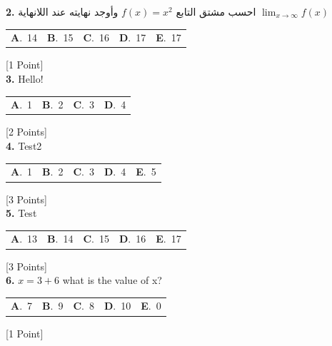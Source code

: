 \documentclass[12pt]{article}
\newcommand{\choice}[2]{\textbf{#1}.~#2}
\begin{document}
\noindent \textbf{\textenglish{2.}} {\textarabic{احسب مشتق التابع }}\( f(x) = x^2\){\textarabic{ وأوجد نهايته عند اللانهاية }}\(\lim_{x \to \infty}f(x)\)

\begin{tabularx}{\linewidth}{@{}*{5}{Y}@{}}
\choice{A}{{{\textenglish{14}}}} & \choice{B}{{{\textenglish{15}}}} & \choice{C}{{{\textenglish{16}}}} & \choice{D}{{{\textenglish{17}}}} & \choice{E}{{{\textenglish{17}}}} \\
\end{tabularx}
\hfill {\textenglish{[1 Point]}}\\[0.5em]

\noindent \textbf{\textenglish{3.}} {\textenglish{Hello!}}

\begin{tabularx}{\linewidth}{@{}*{4}{Y}@{}}
\choice{A}{{{\textenglish{1}}}} & \choice{B}{{{\textenglish{2}}}} & \choice{C}{{{\textenglish{3}}}} & \choice{D}{{{\textenglish{4}}}} \\
\end{tabularx}
\hfill {\textenglish{[2 Points]}}\\[0.5em]

\noindent \textbf{\textenglish{4.}} {\textenglish{Test2}}

\begin{tabularx}{\linewidth}{@{}*{5}{Y}@{}}
\choice{A}{{{\textenglish{1}}}} & \choice{B}{{{\textenglish{2}}}} & \choice{C}{{{\textenglish{3}}}} & \choice{D}{{{\textenglish{4}}}} & \choice{E}{{{\textenglish{5}}}} \\
\end{tabularx}
\hfill {\textenglish{[3 Points]}}\\[0.5em]

\noindent \textbf{\textenglish{5.}} {\textenglish{Test}}

\begin{tabularx}{\linewidth}{@{}*{5}{Y}@{}}
\choice{A}{{{\textenglish{13}}}} & \choice{B}{{{\textenglish{14}}}} & \choice{C}{{{\textenglish{15}}}} & \choice{D}{{{\textenglish{16}}}} & \choice{E}{{{\textenglish{17}}}} \\
\end{tabularx}
\hfill {\textenglish{[3 Points]}}\\[0.5em]

\noindent \textbf{\textenglish{6.}} \(x=3+6 \){\textenglish{ what is the value of x?}}

\begin{tabularx}{\linewidth}{@{}*{5}{Y}@{}}
\choice{A}{{{\textenglish{7}}}} & \choice{B}{{{\textenglish{9}}}} & \choice{C}{{{\textenglish{8}}}} & \choice{D}{{{\textenglish{10}}}} & \choice{E}{{{\textenglish{0}}}} \\
\end{tabularx}
\hfill {\textenglish{[1 Point]}}\\[0.5em]
\end{document}
